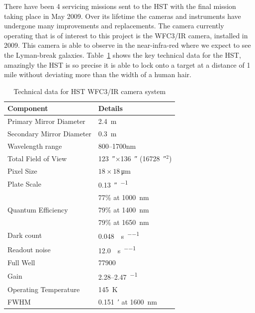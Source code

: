 		There have been 4 servicing missions sent to the HST with the final mission taking place in May 2009. Over its lifetime the cameras and instruments have undergone many improvements and replacements. The camera currently operating that is of interest to this project is the WFC3/IR camera, installed in 2009. This camera is able to observe in the near-infra-red where we expect to see the Lyman-break galaxies. Table~\ref{tab:HST_technical} shows the key technical data for the HST, amazingly the HST is so precise it is able to lock onto a target at a distance of 1 mile without deviating more than the width of a human hair.
		\begin{table}[ht]
			\begin{center}
				\begin{tabular}{l|l}
					Component	& 	Details \\
					\hline\hline
					Primary Mirror Diameter & \SI{2.4}{\metre} \\ \hline
					Secondary Mirror Diameter & \SI{0.3}{\metre} \\ \hline
					Wavelength range & 800--1700\si{\nano\metre} \\ \hline
					Total Field of View & \SI{123}{\arcsecond}$\times$\SI{136}{\arcsecond} (\SI{16728}{\arcsecond}$^2$) \\ \hline
					Pixel Size & $18\times18$\,\si{\micro\metre} \\ \hline
					Plate Scale & \SI{0.13}{\arcsecond\per\pixel} \\ \hline
					\multirow{3}{*}{Quantum Efficiency} & 77\% at \SI{1000}{\nano\metre}\\
					 & 79\% at \SI{1400}{\nano\metre}\\
					 & 79\% at \SI{1650}{\nano\metre}\\ \hline
					Dark count &  \SI{0.048}{\electron\per\second\per\pixel} \\ \hline
					Readout noise & \SI{12.0}{\electron\per\second\per\pixel} \\ \hline
					Full Well & \SI{77900}{\electron} \\ \hline
					Gain & 2.28--2.47\si{\electron\per\ADU} \\ \hline
					Operating Temperature & \SI{145}{\kelvin} \\ \hline
					FWHM & \SI{0.151}{\arcminute} at \SI{1600}{\nano\metre}
				\end{tabular}
			\end{center}
			\caption{Technical data for HST WFC3/IR camera system\cite{WFC3_IHB}}
		\label{tab:HST_technical}
		\end{table}

